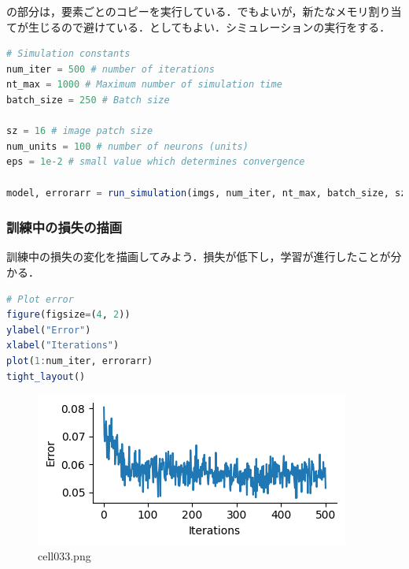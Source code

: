の部分は，要素ごとのコピーを実行している．でもよいが，新たなメモリ割り当てが生じるので避けている．としてもよい．シミュレーションの実行をする．
\begin{lstlisting}[language=julia]
# Simulation constants
num_iter = 500 # number of iterations
nt_max = 1000 # Maximum number of simulation time
batch_size = 250 # Batch size

sz = 16 # image patch size
num_units = 100 # number of neurons (units)
eps = 1e-2 # small value which determines convergence

model, errorarr = run_simulation(imgs, num_iter, nt_max, batch_size, sz, num_units, eps);
\end{lstlisting}
\subsubsection{訓練中の損失の描画}
訓練中の損失の変化を描画してみよう．損失が低下し，学習が進行したことが分かる．
\begin{lstlisting}[language=julia]
# Plot error
figure(figsize=(4, 2))
ylabel("Error")
xlabel("Iterations")
plot(1:num_iter, errorarr)
tight_layout()
\end{lstlisting}
\begin{figure}[ht]
	\centering
	\includegraphics[scale=0.8, max width=\linewidth]{./fig/energy-based-model/sparse-coding/cell033.png}
	\caption{cell033.png}
	\label{cell033.png}
\end{figure}
